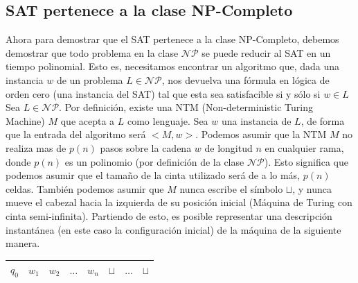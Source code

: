 \documentclass[a4paper]{article}
\begin{document}
\subsection{SAT pertenece a la clase NP-Completo}
Ahora para demostrar que el SAT pertenece a la clase NP-Completo, debemos demostrar que todo problema en la clase $\mathcal{NP}$ se puede reducir al SAT en un tiempo polinomial. Esto es, necesitamos encontrar un algoritmo que, dada una instancia $w$ de un problema $L \in \mathcal{NP}$, nos devuelva una fórmula en lógica de orden cero (una instancia del SAT) tal que esta sea satisfacible si y sólo si $w\in L$\\


Sea $L \in \mathcal{NP}$. Por definición, existe una NTM (Non-deterministic Turing Machine) $M$ que acepta a $L$ como lenguaje. Sea $w$ una instancia de $L$, de forma que la entrada del algoritmo será $<M,w>$. Podemos asumir que la NTM $M$ no realiza mas de $p(n)$ pasos sobre la cadena $w$ de longitud $n$ en cualquier rama, donde $p(n)$ es un polinomio (por definición de la clase $\mathcal{NP}$). Esto significa que podemos asumir que el tamaño de la cinta utilizado será de a lo más, $p(n)$ celdas. También podemos asumir que $M$ nunca escribe el símbolo $\sqcup$, y nunca mueve el cabezal hacia la izquierda de su posición inicial (Máquina de Turing con cinta semi-infinita).
Partiendo de esto, es posible representar una descripción instantánea (en este caso la configuración inicial) de la máquina de la siguiente manera.

\begin{table}
  \begin{center}
    \begin{tabular}{| c | c | c | C{2cm} | c | c | C{4cm} | c |}
      \hline
      $q_0$ & $w_1$ & $w_2$ & $\dots$ & $w_n$ & $\sqcup$ & $\dots$ & $\sqcup$\\
      \hline
    \end{tabular}
  \end{center}
\end{table}
\end{document}
